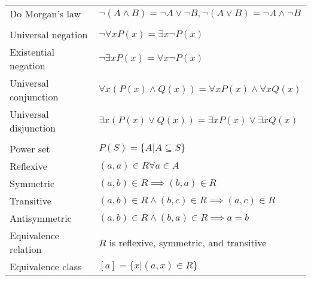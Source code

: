 \documentclass[a4paper,landscape]{article}
\begin{document}
\begin{multicols*}{2}
\begin{tabularx}{\columnwidth}{@{}lX@{}}
        Do Morgan's law                            & $\neg (A \land B) = \neg A \lor \neg B, \neg (A \lor B) = \neg A \land \neg B$                                       \\
        \\
        Universal negation                         & $\neg \forall x P(x) = \exists x \neg P(x)$                                                                          \\
        Existential negation                       & $\neg \exists x P(x) = \forall x \neg P(x)$                                                                          \\
        Universal conjunction                      & $\forall x (P(x) \land Q(x)) = \forall x P(x) \land \forall x Q(x)$                                                  \\
        Universal disjunction                      & $ \exists x (P(x) \lor Q(x)) = \exists x P(x) \lor \exists x Q(x)$                                                   \\
        \\
        Power set                                  & $P(S) = \{A | A \subseteq S\}$                                                                                       \\
        Reflexive                                  & $(a,a) \in R \forall a \in A$                                                                                        \\
        Symmetric                                  & $(a,b) \in R \implies (b,a) \in R$                                                                                   \\
        Transitive                                 & $(a,b) \in R \land (b,c) \in R \implies (a,c) \in R$                                                                 \\
        Antisymmetric                              & $(a,b) \in R \land (b,a) \in R \implies a = b$                                                                       \\
        Equivalence relation                       & $R$ is reflexive, symmetric, and transitive                                                                          \\
        Equivalence class                          & $[a] = \{x | (a,x) \in R\}$                                                                                          \\

\end{tabularx}
\end{multicols*}
\end{document}

